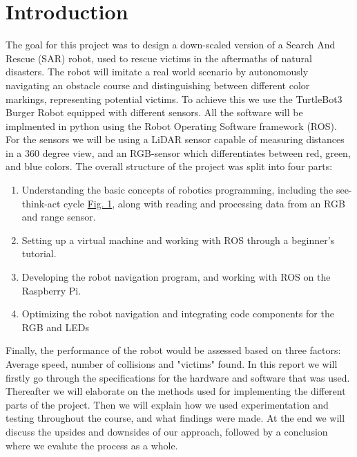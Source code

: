 \documentclass[conference]{IEEEtran}
\begin{document}
\section{Introduction}
The goal for this project was to design a down-scaled version of a Search And Rescue (SAR) robot, used to rescue victims in the aftermaths of natural disasters.
The robot will imitate a real world scenario by autonomously navigating an obstacle course and distinguishing between different color markings, representing potential victims. To achieve this we use the TurtleBot3 Burger Robot equipped with different sensors.
All the software will be implmented in python using the Robot Operating Software framework (ROS). For the sensors we will be using a LiDAR sensor capable of measuring distances in a 360 degree view, and an RGB-sensor which differentiates between red, green, and blue colors. 
The overall structure of the project was split into four parts:
\begin{enumerate}
    \item Understanding the basic concepts of robotics programming, including the see-think-act cycle \href{sec:STAC}{Fig. 1}, along with reading and processing data from an RGB and range sensor.
    \item Setting up a virtual machine and working with ROS through a beginner's tutorial.
    \item Developing the robot navigation program, and working with ROS on the Raspberry Pi.
    \item Optimizing the robot navigation and integrating code components for the RGB and LEDs
\end{enumerate} 
Finally, the performance of the robot would be assessed based on three factors: Average speed, number of collisions and "victims" found.
In this report we will firstly go through the specifications for the hardware and software that was used.
Thereafter we will elaborate on the methods used for implementing the different parts of the project.
Then we will explain how we used experimentation and testing throughout the course, and what findings were made.
At the end we will discuss the upsides and downsides of our approach, followed by a conclusion where we evalute the process as a whole.
\end{document}
